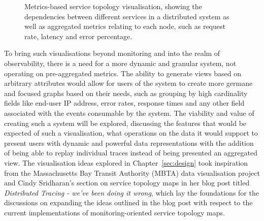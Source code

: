\documentclass[12pt,pdftex,titlepage]{report}
\begin{document}
                \medskip
                \begin{figure}[hbt!]
                    \centering
                    \caption[A metrics-based service topology visualisation]{Metrics-based service topology visualisation, showing the dependencies between different services in a distributed system as well as
                    aggregated metrics relating to each node, such as request rate, latency and error percentage.}
                \end{figure}
                
                \newpage
                To bring such visualisations beyond monitoring and into the realm of observability, there is a need for a more dynamic and granular 
                system, not operating on pre-aggregated metrics. The ability to generate views based on arbitrary attributes would allow for users 
                of the system to create more germane and focused graphs based on their needs, such as grouping by high cardinality fields like end-user IP address, 
                error rates, response times and any other field associated with the events consumable by the system\cite{doingitwrongtopo}. The viability and 
                value of creating such a system will be explored, discussing the features that would be expected of such a visualisation, what operations on the
                data it would support to present users with dynamic and powerful data representations with the addition of being able to replay individual traces 
                instead of being presented an aggregated view. The visualisation ideas explored in Chapter~\ref{sec:design} took inspiration from
                the Massachusetts Bay Transit Authority (MBTA) data visualisation project\cite{mbta} and Cindy Sridharan's section on service topology maps in her blog 
                post titled \textit{Distributed Tracing - we've been doing it wrong}\cite{doingitwrongtopo}, which lay the foundations for the discussions on 
                expanding the ideas outlined in the blog post with respect to the current implementations of monitoring-oriented service topology maps.
    
\end{document}
